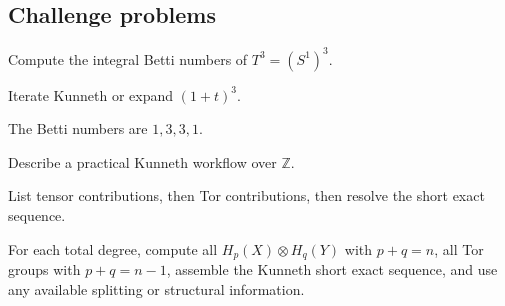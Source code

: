 \subsection*{Challenge problems}

\begin{exercise}\label{exr:viii27-ped-15}
Compute the integral Betti numbers of $T^3=(S^1)^3$.
\end{exercise}
\begin{hint}
Iterate Kunneth or expand $(1+t)^3$.
\end{hint}
\begin{solution}
The Betti numbers are $1,3,3,1$.
\end{solution}

\begin{exercise}\label{exr:viii27-ped-16}
Describe a practical Kunneth workflow over $\mathbb Z$.
\end{exercise}
\begin{hint}
List tensor contributions, then Tor contributions, then resolve the short exact sequence.
\end{hint}
\begin{solution}
For each total degree, compute all $H_p(X)\otimes H_q(Y)$ with $p+q=n$, all Tor groups with $p+q=n-1$, assemble the Kunneth short exact sequence, and use any available splitting or structural information.
\end{solution}


